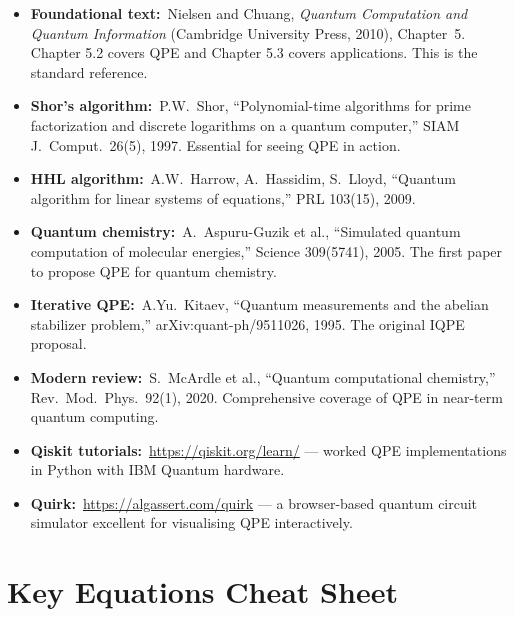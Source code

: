 \documentclass[12pt,a4paper]{article}
\newcommand{\QPE}{\textsc{QPE}}
\begin{document}
\begin{itemize}[leftmargin=*]
  \item \textbf{Foundational text:}\ Nielsen and Chuang, \textit{Quantum
        Computation and Quantum Information} (Cambridge University Press, 2010),
        Chapter~5.  Chapter 5.2 covers \QPE{} and Chapter 5.3 covers
        applications.  This is the standard reference.

  \item \textbf{Shor's algorithm:}\ P.W.\ Shor, ``Polynomial-time algorithms
        for prime factorization and discrete logarithms on a quantum computer,''
        SIAM J.\ Comput.\ 26(5), 1997.  Essential for seeing \QPE{} in action.

  \item \textbf{HHL algorithm:}\ A.W.\ Harrow, A.\ Hassidim, S.\ Lloyd,
        ``Quantum algorithm for linear systems of equations,'' PRL 103(15), 2009.

  \item \textbf{Quantum chemistry:}\ A.\ Aspuru-Guzik et al., ``Simulated
        quantum computation of molecular energies,'' Science 309(5741), 2005.
        The first paper to propose \QPE{} for quantum chemistry.

  \item \textbf{Iterative QPE:}\ A.Yu.\ Kitaev, ``Quantum measurements and
        the abelian stabilizer problem,'' arXiv:quant-ph/9511026, 1995.
        The original IQPE proposal.

  \item \textbf{Modern review:}\ S.\ McArdle et al., ``Quantum computational
        chemistry,'' Rev.\ Mod.\ Phys.\ 92(1), 2020.  Comprehensive coverage
        of \QPE{} in near-term quantum computing.

  \item \textbf{Qiskit tutorials:}\ \url{https://qiskit.org/learn/} — worked
        \QPE{} implementations in Python with IBM Quantum hardware.

  \item \textbf{Quirk:}\ \url{https://algassert.com/quirk} — a browser-based
        quantum circuit simulator excellent for visualising \QPE{} interactively.
\end{itemize}

\newpage

\section{Key Equations Cheat Sheet}
\label{sec:cheatsheet}
\end{document}
